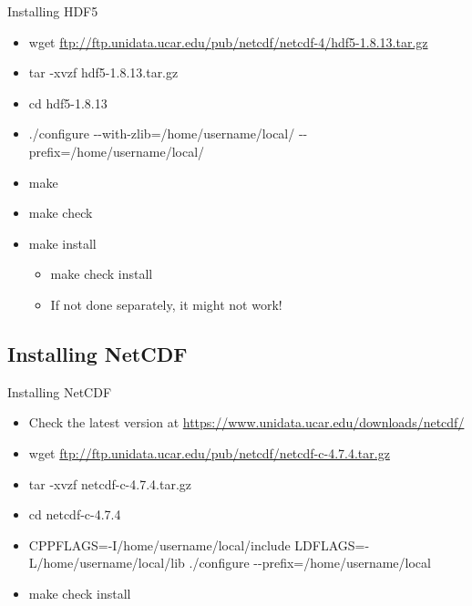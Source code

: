 \documentclass[compress,11pt,xcolor=svgnames,aspectratio=169]{beamer}
\begin{document}
\begin{frame}[fragile]{Installing HDF5}

\begin{itemize}
\setlength\itemsep{0.3cm}

  \item {\footnotesize wget \url{ftp://ftp.unidata.ucar.edu/pub/netcdf/netcdf-4/hdf5-1.8.13.tar.gz}}
  \item tar -xvzf hdf5-1.8.13.tar.gz
  \item cd hdf5-1.8.13
  \item ./configure {-}{-}with-zlib=/home/username/local/ {-}{-}prefix=/home/username/local/
  \item make
  \item make check
  \item make install
  \begin{itemize}
    \item make check install
    \item If not done separately, it might not work!
  \end{itemize}
\end{itemize}

\end{frame}

\subsection{Installing NetCDF}

\begin{frame}[fragile]{Installing NetCDF}

\begin{itemize}
\setlength\itemsep{0.3cm}

  \item Check the latest version at \url{https://www.unidata.ucar.edu/downloads/netcdf/}
  \item {\footnotesize wget \url{ftp://ftp.unidata.ucar.edu/pub/netcdf/netcdf-c-4.7.4.tar.gz}}
  \item tar -xvzf netcdf-c-4.7.4.tar.gz
  \item cd netcdf-c-4.7.4
  \item CPPFLAGS=-I/home/username/local/include LDFLAGS=-L/home/username/local/lib ./configure {-}{-}prefix=/home/username/local
  \item make check install

\end{itemize}

\end{frame}
\end{document}
